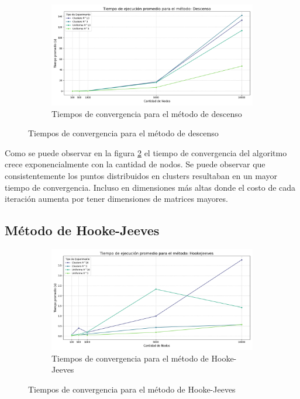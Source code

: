 \documentclass[10pt]{article}
\begin{document}
\begin{figure}[H]
	\centering
	\begin{subfigure}[t]{0.9\textwidth}
	\centering
	\includegraphics[width=\linewidth]{figuras/Descenso_runtime_plot.png}
	\caption{Tiempos de convergencia para el método de descenso}
	\label{fig:desc}
\end{subfigure}
\end{figure}

Como se puede observar en la figura \ref{fig:desc} el tiempo de convergencia del algoritmo crece exponencialmente con la cantidad de nodos. Se puede observar que consistentemente los puntos distribuidos en clusters resultaban en un mayor tiempo de convergencia. Incluso en dimensiones más altas donde el costo de cada iteración aumenta por tener dimensiones de matrices mayores.

\subsection{Método de Hooke-Jeeves}

\begin{figure}[H]
	\begin{subfigure}[t]{0.9\textwidth}
	\centering
	\includegraphics[width=\linewidth]{figuras/HookeJeeves_runtime_plot.png}
	\caption{Tiempos de convergencia para el método de Hooke-Jeeves}
		\label{fig:hj}
\end{subfigure}
\end{figure}
\end{document}
